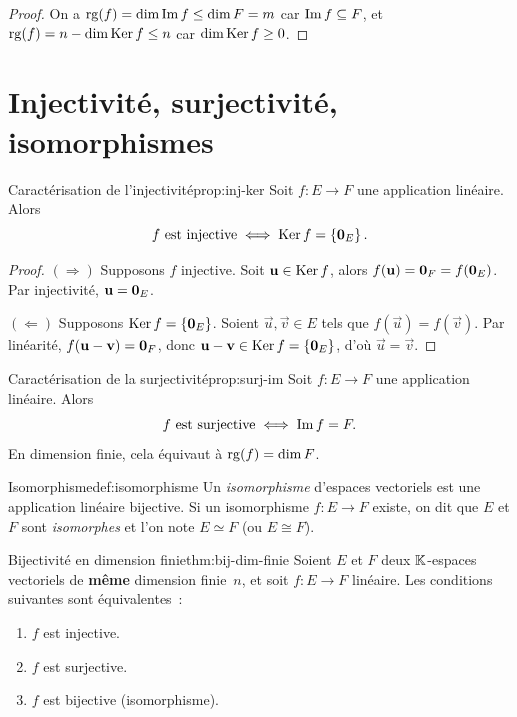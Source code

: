 \begin{proof}
  On a $\operatorname{rg}(f)=\dim\operatorname{Im} f\leq\dim F=m$ car $\operatorname{Im} f\subseteq F$, et
  $\operatorname{rg}(f)=n-\dim\operatorname{Ker} f\leq n$ car $\dim\operatorname{Ker} f\geq 0$.
\end{proof}

\section{Injectivité, surjectivité, isomorphismes}\label{sec:inj-surj-iso}

\begin{proposition}{Caractérisation de l'injectivité}{prop:inj-ker}
  Soit $f\colon E\to F$ une application linéaire. Alors
  \[
    f\text{ est injective}\iff\operatorname{Ker} f=\left\{\mathbf{0}_E\right\}.
  \]
\end{proposition}

\begin{proof}
  $(\Rightarrow)$ Supposons $f$ injective. Soit $\mathbf{u}\in\operatorname{Ker} f$, alors
  $f(\mathbf{u})=\mathbf{0}_F=f(\mathbf{0}_E)$. Par injectivité, $\mathbf{u}=\mathbf{0}_E$.

  $(\Leftarrow)$ Supposons $\operatorname{Ker} f=\left\{\mathbf{0}_E\right\}$. Soient
  $\vec{u},\vec{v}\in E$ tels que $f(\vec{u})=f(\vec{v})$. Par linéarité,
  $f(\mathbf{u}-\mathbf{v})=\mathbf{0}_F$, donc $\mathbf{u}-\mathbf{v}\in\operatorname{Ker} f
  =\left\{\mathbf{0}_E\right\}$, d'où $\vec{u}=\vec{v}$.
\end{proof}

\begin{proposition}{Caractérisation de la surjectivité}{prop:surj-im}
  Soit $f\colon E\to F$ une application linéaire. Alors
  \[
    f\text{ est surjective}\iff\operatorname{Im} f=F.
  \]
  En dimension finie, cela équivaut à $\operatorname{rg}(f)=\dim F$.
\end{proposition}

\begin{definition}{Isomorphisme}{def:isomorphisme}
  Un \emph{isomorphisme} d'espaces vectoriels est une
  application linéaire bijective. Si un isomorphisme $f\colon E\to F$
  existe, on dit que $E$ et $F$ sont \emph{isomorphes} et
  l'on note $E\simeq F$ (ou $E\cong F$).
\end{definition}

\begin{theorem}{Bijectivité en dimension finie}{thm:bij-dim-finie}
  Soient $E$ et $F$ deux ${\mathbb{K}}$-espaces vectoriels de \textbf{même} dimension
  finie~$n$, et soit $f\colon E\to F$ linéaire. Les conditions suivantes
  sont équivalentes~:
  \begin{enumerate}[label=(\roman*)]
    \item $f$ est injective.
    \item $f$ est surjective.
    \item $f$ est bijective (isomorphisme).
  \end{enumerate}
\end{theorem}

